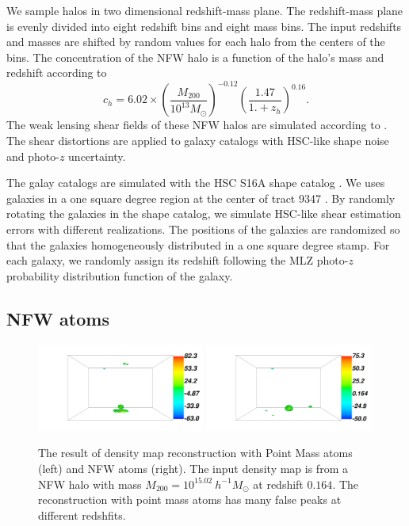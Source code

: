\documentclass[twocolumn]{aastex62}
\begin{document}
We sample halos in two dimensional redshift-mass plane. The redshift-mass plane is evenly divided into eight redshift bins
and eight mass bins. The input redshifts and masses are shifted by random values for each halo from the centers 
of the bins.
The concentration of the NFW halo is a function of the halo's mass and redshift according to 
\citet{c-M_Magneticum-Ragagnin2019}
\begin{equation}
c_{h}=6.02\times(\frac{M_{200}}{10^{13} M_{\odot}})^{-0.12}(\frac{1.47}{1.+z_h})^{0.16}.
\end{equation}
The weak lensing shear fields of these NFW halos are simulated according to \citet{haloModel-TJ2003-3pt}. The shear 
distortions are applied to galaxy catalogs with HSC-like shape noise and photo-$z$ uncertainty. 

The galay catalogs are simulated with the HSC S16A shape catalog \citep{HSC1-catalog}. 
We uses galaxies in a one square degree region at the center of tract 9347 \citep{HSC1-data}.
By randomly rotating the galaxies in the shape catalog, we simulate HSC-like shear estimation errors 
with different realizations.
The positions of the galaxies are randomized so that the galaxies homogeneously distributed in a one square degree 
stamp.
For each galaxy, we randomly assign its redshift following the MLZ photo-$z$ probability distribution function 
\citep{HSC1-photoz} of the galaxy.

\subsection{NFW atoms}
\label{subsec:test-nfw}

\begin{figure}[!t]
\centering
\includegraphics[width=0.49\textwidth]{delta-1-7-pz-wn-PM-falsepeakproblem.pdf}
\includegraphics[width=0.49\textwidth]{delta-1-7-pz-wn-NFW-falsepeakproblem.pdf}
\caption{The result of density map reconstruction with  Point Mass atoms (left) and  NFW atoms (right). The input density 
        map is from a NFW halo with mass $M_{200}=10^{15.02} ~h^{-1}M_{\odot}$ at redshift $0.164$. The reconstruction 
        with point mass atoms has many false peaks at different redshfits.
        } \label{fig-lassoVsadaLasso}
\end{figure}
\end{document}
